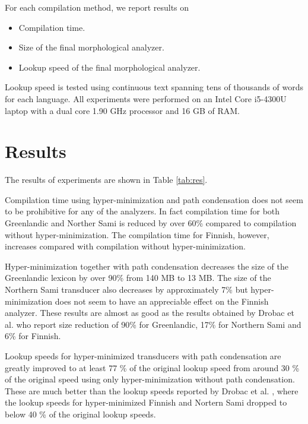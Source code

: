 \documentclass[11pt]{article}
\begin{document}
For each compilation method, we report results on 

\begin{itemize}
\item Compilation time.
\item Size of the final morphological analyzer.
\item Lookup speed of the final morphological analyzer.
\end{itemize}

Lookup speed is tested using continuous text spanning tens of
thousands of words for each language. All experiments were performed
on an Intel Core i5-4300U laptop with a dual core 1.90 GHz processor
and 16 GB of RAM.

\section{Results}\label{sec:results}

The results of experiments are shown in Table
\ref{tab:res}. 

Compilation time using hyper-minimization and path condensation does
not seem to be prohibitive for any of the analyzers. In fact
compilation time for both Greenlandic and Norther Sami is reduced by
over 60\% compared to compilation without hyper-minimization. The
compilation time for Finnish, however, increases compared with compilation without
hyper-minimization.

Hyper-minimization together with path condensation decreases the size
of the Greenlandic lexicon by over 90\% from 140 MB to 13 MB. The size
of the Northern Sami transducer also decreases by approximately 7\%
but hyper-minimization does not seem to have an appreciable effect on the
Finnish analyzer. These results are almost as good as the results
obtained by Drobac et al.  who report size
reduction of 90\% for Greenlandic, 17\% for Northern Sami and 6\% for
Finnish.

Lookup speeds for hyper-minimized transducers with path condensation
are greatly improved to at least 77 \% of the original lookup speed
from around 30 \% of the original speed using only hyper-minimization
without path condensation. These are much better than the lookup
speeds reported by Drobac et al. , where the
lookup speeds for hyper-minimized Finnish and Nortern Sami dropped to
below 40 \% of the original lookup speeds.
\end{document}
